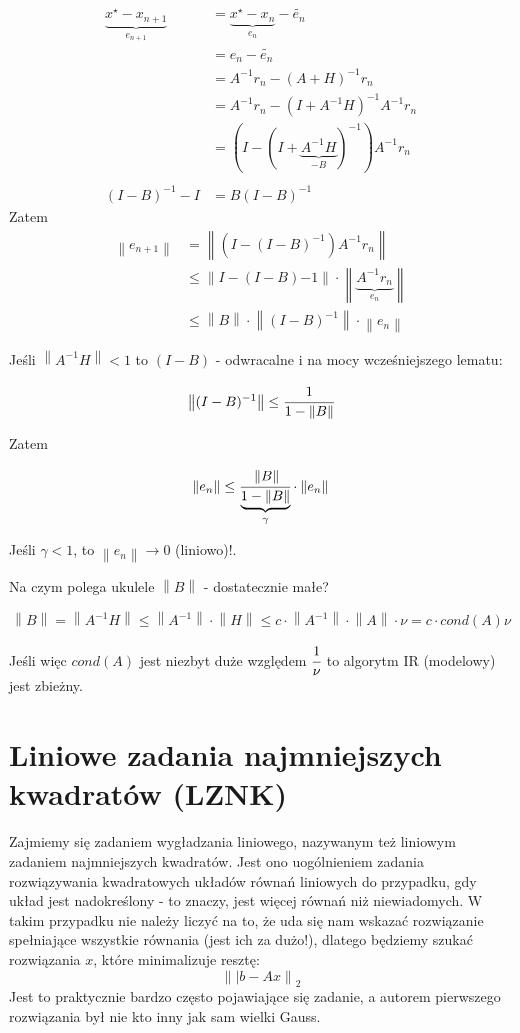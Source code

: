 \documentclass[hidelinks,a4paper,fleqn]{article}
\newcommand{\ra}{\rightarrow}
\newcommand{\norm}[1]{\left\lVert#1\right\rVert}
\begin{document}
\begin{align*}
	\underbrace{x^\star - x_{n+1}}_{e_{n+1}} & = \underbrace{x^\star - x_n}_{e_n} - \tilde{e_n} \\
	& = e_n - \tilde{e_n} \\
	& = A^{-1}r_n  - (A+H)^{-1}r_n \\
	& = A^{-1}r_n - (I + A^{-1}H)^{-1}A^{-1}r_n \\
	& = (I - (I + \underbrace{A^{-1}H}_{-B})^{-1})A^{-1}r_n \\ \\
	(I - B)^{-1} - I & = B(I - B)^{-1}
\end{align*}
Zatem
\begin{align*}
	\norm{e_{n+1}} & = \norm{(I - (I - B)^{-1})A^{-1} r_n} \\
	& \leq \norm{I - (I - B){-1}} \cdot \norm{\underbrace{A^{-1} r_n}_{e_n}} \\
	& \leq \norm{B} \cdot \norm{(I - B)^{-1}} \cdot \norm{e_n}
\end{align*}

Jeśli $\norm{A^{-1}H} < 1$ to $(I - B)$ - odwracalne i na mocy wcześniejszego lematu:

\[
	\norm{(I - B)^{-1}} \leq \cfrac{1}{1 - \norm{B}}
\]

Zatem

\[
	\norm{e_n} \leq \cfrac{\norm{B}}{\underbrace{1 - \norm{B}}_{\gamma}} \cdot \norm{e_n}
\]

Jeśli $\gamma < 1$, to $\norm{e_n} \ra 0$ (liniowo)!.

Na czym polega ukulele $\norm{B}$ - dostatecznie małe?

\[
	\norm{B} = \norm{A^{-1} H} \leq \norm{A^{-1}} \cdot \norm{H} \leq c \cdot \norm{A^{-1}} \cdot \norm{A} \cdot \nu = c \cdot cond(A) \nu
\]

Jeśli więc $cond(A)$ jest niezbyt duże względem $\cfrac{1}{\nu}$ to algorytm IR (modelowy) jest zbieżny.

\section{Liniowe zadania najmniejszych kwadratów (LZNK)}
Zajmiemy się zadaniem wygładzania liniowego, nazywanym też liniowym zadaniem najmniejszych kwadratów. Jest ono uogólnieniem zadania rozwiązywania kwadratowych układów równań liniowych do przypadku, gdy układ jest nadokreślony - to znaczy, jest więcej równań niż niewiadomych. W takim przypadku nie należy liczyć na to, że uda się nam wskazać rozwiązanie spełniające wszystkie równania (jest ich za dużo!), dlatego będziemy szukać rozwiązania $x$, które minimalizuje resztę:
\[\norm{|b-Ax}_2\]
Jest to praktycznie bardzo często pojawiające się zadanie, a autorem pierwszego rozwiązania był nie kto inny jak sam wielki Gauss.
\end{document}
